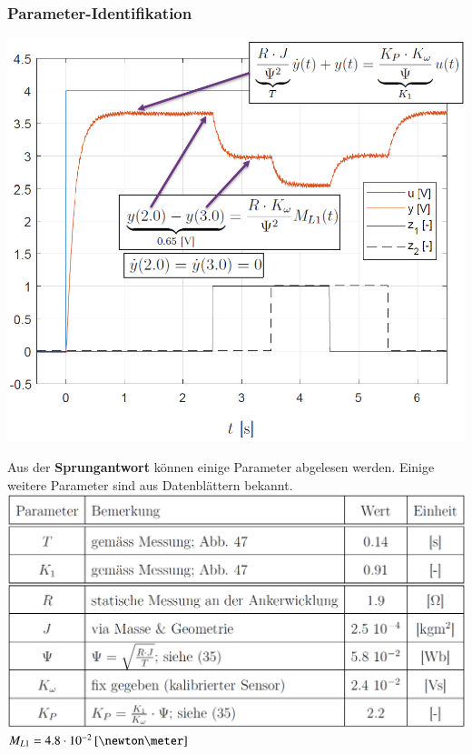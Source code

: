 \subsubsection{Parameter-Identifikation}

\begin{minipage}[c]{0.48\columnwidth}
    \includegraphics[width=\columnwidth]{images/gleichstrommodell_parameteridentifikation.png}
\end{minipage}
\hfill
\begin{minipage}[c]{0.48\columnwidth}
    Aus der \textbf{Sprungantwort} können einige Parameter abgelesen werden. Einige weitere Parameter sind aus Datenblättern bekannt.
    \includegraphics[width=\columnwidth]{images/gleichstrommodell_parameter.png}
    $M_{L1} = 4.8 \cdot 10^{-2} \, [\newton \meter]$
    
\end{minipage}


